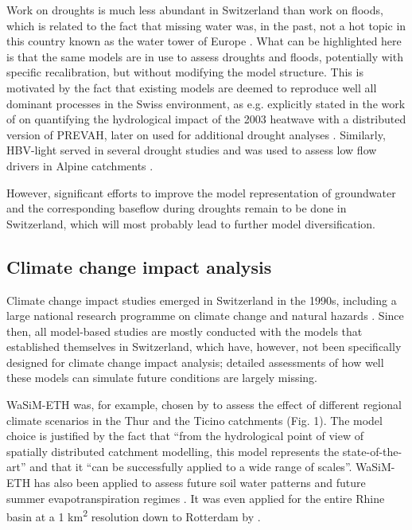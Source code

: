 \documentclass[10pt,a4paper]{article}
\begin{document}
Work on droughts is much less abundant in Switzerland than work on
floods, which is related to the fact that missing water was, in the
past, not a hot topic in this country known as the water tower of
Europe \citep{Milano2015}. What can be highlighted here is that the same
models are in use to assess droughts and floods, potentially with
specific recalibration, but without modifying the model structure. This
is motivated by the fact that existing models are deemed to reproduce
well all dominant processes in the Swiss environment, as e.g. explicitly
stated in the work of \citet{Zappa2007a} on quantifying the hydrological
impact of the 2003 heatwave with a distributed version of PREVAH, later
on used for additional drought analyses \citep{Brunner2019,Zappa2019}. Similarly,
HBV-light served in several drought studies \citep{Staudinger2014,Staudinger2014a,Staudinger2015} and was
used to assess low flow drivers in Alpine catchments \citep{Arnoux_2020}.

However, significant efforts to improve the model representation of
groundwater and the corresponding baseflow during droughts remain to be
done in Switzerland, which will most probably lead to further model
diversification.

\subsection{Climate change impact analysis}
\label{sec:application:climatechange}

Climate change impact studies emerged in Switzerland in the 1990s,
including a large national research programme on climate change and
natural hazards \citep{snfs}. Since then, all model-based studies
are mostly conducted with the models that established themselves in
Switzerland, which have, however, not been specifically designed for
climate change impact analysis; detailed assessments of how well these
models can simulate future conditions are largely missing.

WaSiM-ETH was, for example, chosen by \citet{Jasper2004} to assess the
effect of different regional climate scenarios in the Thur and the
Ticino catchments (Fig. 1). The model choice is justified by the fact
that ``from the hydrological point of view of spatially distributed
catchment modelling, this model represents the state-of-the-art'' and
that it ``can be successfully applied to a wide range of scales''. 
WaSiM-ETH has also been applied to assess future soil water
patterns \citep{Jasper2006,Rossler2012} and future summer evapotranspiration
regimes \citep{Calanca2006}. It was even applied for the entire Rhine
basin at a 1 km\textsuperscript{2} resolution down to Rotterdam
by \citet{Kleinn_2005}.
\end{document}
